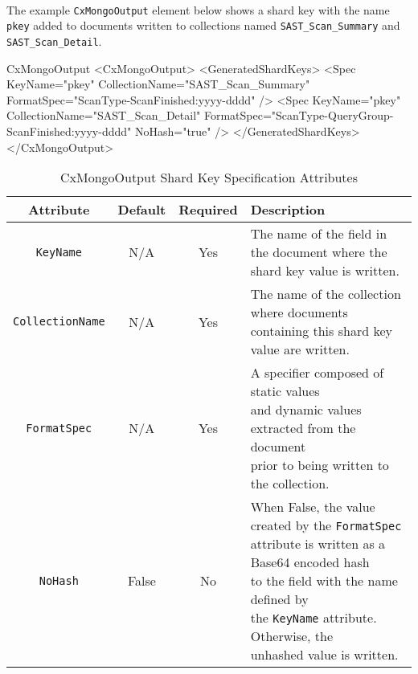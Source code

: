 \noindent\\The example \texttt{CxMongoOutput} element below shows a shard key with the name \texttt{pkey} added to documents
written to collections named \texttt{SAST\_Scan\_Summary} and \texttt{SAST\_Scan\_Detail}.

\begin{xml}{CxMongoOutput}{\contentvariables}{}
<CxMongoOutput>
    <GeneratedShardKeys>
        <Spec 
            KeyName="pkey" 
            CollectionName="SAST_Scan_Summary" 
            FormatSpec="{ScanType}-{ScanFinished:yyyy-dddd}"
            />
        <Spec 
            KeyName="pkey" 
            CollectionName="SAST_Scan_Detail" 
            FormatSpec="{ScanType}-{QueryGroup}-{ScanFinished:yyyy-dddd}" 
            NoHash="true" 
            />
    </GeneratedShardKeys>
</CxMongoOutput>
\end{xml}
    

\begin{table}[h]
    \caption{CxMongoOutput Shard Key Specification Attributes}        
    \begin{tabularx}{\textwidth}{cccl}
        \toprule
        \textbf{Attribute} & \textbf{Default} & \textbf{Required} & \textbf{Description}\\
        \midrule
        \texttt{KeyName} & N/A & Yes & \makecell[l]{The name of the field in the document where the\\shard key value is written.}\\
        \midrule
        \texttt{CollectionName} & N/A & Yes & \makecell[l]{The name of the collection where documents\\
        containing this shard key value are written.}\\
        \midrule
        \texttt{FormatSpec} & N/A & Yes & \makecell[l]{A specifier composed of static values\\
        and dynamic values extracted from the document\\
        prior to being written to the collection.}\\
        \midrule
        \texttt{NoHash} & False & No & \makecell[l]{When False, the value created by the \texttt{FormatSpec}\\
        attribute is written as a Base64 encoded hash\\
        to the field with the name defined by\\
        the \texttt{KeyName} attribute.  Otherwise, the\\
        unhashed value is written.}\\
        \bottomrule
    \end{tabularx}
\end{table}


